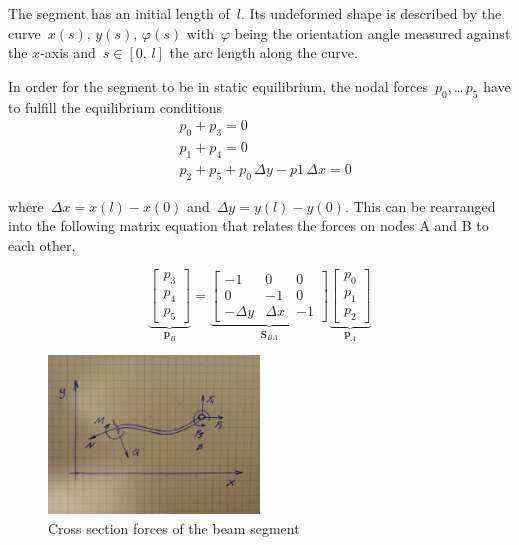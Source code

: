 The segment has an initial length of~$l$. Its undeformed shape is described by the curve~$x(s)$, $y(s)$, $\varphi(s)$ with~$\varphi$ being the orientation angle measured against the $x$-axis and~$s \in [0,\,l]$ the arc length along the curve.

In order for the segment to be in static equilibrium, the nodal forces~$p_0$,\,\ldots\,$p_5$ have to fulfill the equilibrium conditions
%
\begin{align}
&p_0 + p_3 = 0 \\
&p_1 + p_4 = 0 \\
&p_2 + p_5 + p_0\,\Delta y - p1\,\Delta x = 0
\end{align}

where~$\Delta x = x(l) - x(0)$ and~$\Delta y = y(l) - y(0)$. This can be rearranged into the following matrix equation that relates the forces on nodes A and B to each other,

\begin{equation}
\underbrace{
\begin{bmatrix}
p_3 \\ p_4 \\ p_5
\end{bmatrix}
}_{\boldsymbol{p}_B}
=
\underbrace{
\begin{bmatrix}
-1 &  0 & 0 \\
 0 & -1 & 0 \\
-\Delta y & \Delta x & -1
\end{bmatrix}
}_{\boldsymbol{S}_{BA}}
\underbrace{
\begin{bmatrix}
p_0 \\ p_1 \\ p_2
\end{bmatrix}
}_{\boldsymbol{p}_A}
\label{eq:linear-beam-static-relation}
\end{equation}

\begin{figure}[h]
\centering
\includegraphics[width=0.5\textwidth]{figures/elements/beam-linear-2}
\caption{Cross section forces of the beam segment}
\label{fig:beam-linear-2}
\end{figure}

